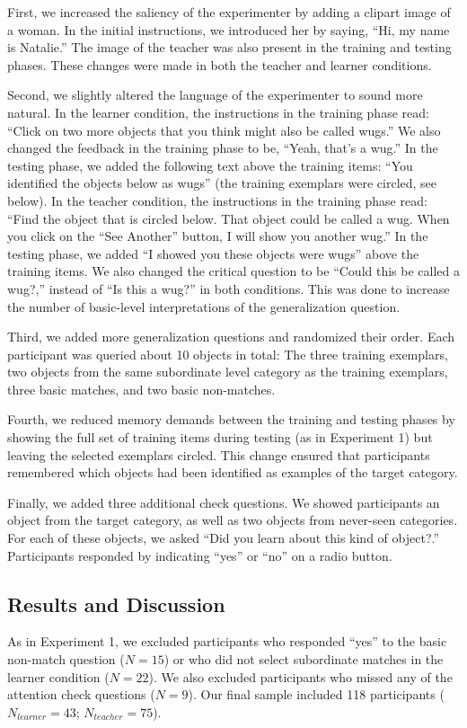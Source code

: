 \documentclass[man]{apa2}
\begin{document}
First, we increased the saliency of the experimenter by adding a clipart image of a woman. In the initial instructions, we introduced her by saying, ``Hi, my name is Natalie.'' The image of the teacher was also present in the training and testing phases. These changes were made in both the teacher and learner conditions.

Second, we slightly altered the language of the experimenter to sound more natural. In the learner condition, the instructions in the training phase read: ``Click on two more objects that you think might also be called wugs.'' We also changed the feedback in the training phase to be, ``Yeah, that's a wug.'' In the testing phase, we added the following text above the training items: ``You identified the objects below as wugs'' (the training exemplars were circled, see below). In the teacher condition, the instructions in the training phase read: ``Find the object that is circled below. That object could be called a wug. When you click on the ``See Another'' button, I will show you another wug.'' In the testing phase, we added ``I showed you these objects were wugs'' above the training items. We also changed the critical question to be ``Could this be called a wug?,'' instead of ``Is this a wug?'' in both conditions. This was done to increase the number of basic-level interpretations of the generalization question. 

Third, we added more generalization questions and randomized their order. Each participant was queried about 10 objects in total: The three training exemplars, two objects from the same subordinate level category as the training exemplars, three basic matches, and two basic non-matches. 

Fourth, we reduced memory demands between the training and testing phases by showing the full set of training items during testing (as in Experiment 1) but leaving the selected exemplars circled. This change ensured that participants remembered which objects had been identified as examples of the target category. 

Finally, we added three additional check questions. We showed participants an object from the target category, as well as two objects from never-seen categories. For each of these objects, we asked ``Did you learn about this kind of object?.'' Participants responded by indicating ``yes'' or ``no'' on a radio button.

\subsection{Results and Discussion}
As in Experiment 1, we excluded participants who responded ``yes'' to the basic non-match question ($N=15$) or who did not select subordinate matches in the learner condition ($N = 22$). We also excluded participants who missed any of the attention check questions ($N = 9$). Our final sample included 118 participants ($N_{learner} = 43$; $N_{teacher} = 75$).
\end{document}
